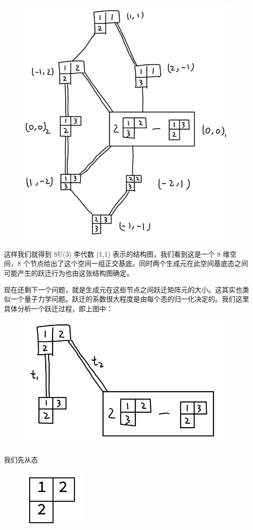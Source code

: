 \documentclass[UTF8]{ctexart}
\begin{document}
\begin{figure}[H]
\begin{centering}
\includegraphics[width=0.5\linewidth]{include/T3}
\par\end{centering}
\end{figure}

\noindent 这样我们就得到 SU(3) 李代数 (1,1) 表示的结构图，我们看到这是一个 8 维空间，8 个节点给出了这个空间一组正交基底。同时两个生成元在此空间基底态之间可能产生的跃迁行为也由这张结构图确定。

现在还剩下一个问题，就是生成元在这些节点之间跃迁矩阵元的大小。这其实也类似一个量子力学问题。跃迁的系数很大程度是由每个态的归一化决定的。我们这里具体分析一个跃迁过程，即上图中：

\begin{figure}[H]
\begin{centering}
\includegraphics[width=0.4\linewidth]{include/T4}
\par\end{centering}
\end{figure}

\noindent 我们先从态

\begin{figure}[H]
\begin{centering}
\includegraphics[width=0.1\linewidth]{include/Y4}
\par\end{centering}
\end{figure}
\end{document}
